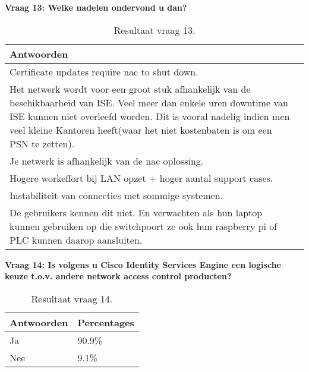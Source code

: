 \newpage
\textbf{Vraag 13: Welke nadelen ondervond u dan?}
\begin{table}[H]
	\begin{center}
		\newlength\q
		\setlength{}
		\noindent\begin{tabular}{p{\q}p{\q}}
			\hline
		\bf Antwoorden \\ \hline
		Certificate updates require nac to shut down. \\ \hline
		Het netwerk wordt voor een groot stuk afhankelijk van de beschikbaarheid van ISE. Veel meer dan enkele uren downtime van ISE kunnen niet overleefd worden. Dit is vooral nadelig indien men veel kleine Kantoren heeft(waar het niet kostenbaten is om een PSN te zetten). \\ \hline
		Je netwerk is afhankelijk van de nac oplossing.  \\ \hline
		Hogere workeffort bij LAN opzet + hoger aantal support cases. \\ \hline
		Instabiliteit van connecties met sommige systemen. \\ \hline
		De gebruikers kennen dit niet. En verwachten als hun laptop kunnen gebruiken op die switchpoort ze ook hun raspberry pi of PLC kunnen daarop aansluiten.       \\ \hline                                                  
		\end{tabular}
		\caption{Resultaat vraag 13.}
	\end{center}
\end{table}

\textbf{Vraag 14: Is volgens u Cisco Identity Services Engine een logische keuze t.o.v. andere network access control producten?} 

\begin{table}[H]
	\begin{center}
		\begin{tabular}{|l|l|}
			\hline
			\bf Antwoorden    & \bf Percentages \\ \hline
			Ja      & 90.9\% \\ \hline
			Nee     & 9.1\%    \\ \hline                                                           
		\end{tabular}
		\caption{Resultaat vraag 14.}
	\end{center}
\end{table}


